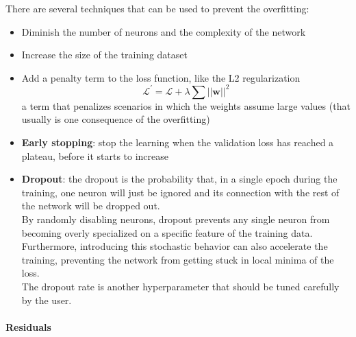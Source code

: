 There are several techniques that can be used to prevent the overfitting:
\begin{itemize}
    \item Diminish the number of neurons and the complexity of the network
    \item Increase the size of the training dataset
    \item Add a penalty term to the loss function, like the L2 regularization
    \begin{equation}
        \mathcal{L}^{'}=\mathcal{L}+\lambda \sum ||\bm{w}||^2
    \end{equation}
    a term that penalizes scenarios in which the weights assume large values (that usually is one consequence of the overfitting)
    \item \textbf{Early stopping}: stop the learning when the validation loss has reached a plateau, before it starts to increase
    \item \textbf{Dropout}: the dropout \cite{Srivastava2014Dropout:Overfitting} is the probability that, in a single epoch during the training, one neuron will just be ignored and its connection with the rest of the network will be dropped out. \\
    By randomly disabling neurons, dropout prevents any single neuron from becoming overly specialized on a specific feature of the training data.\\
    Furthermore, introducing this stochastic behavior can also accelerate the training, preventing the network from getting stuck in local minima of the loss.\\
    The dropout rate is another hyperparameter that should be tuned carefully by the user.
\end{itemize}

\paragraph*{Residuals}\hspace{1cm}\\

